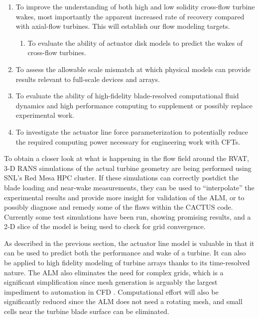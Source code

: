 \begin{enumerate}

	\item To improve the understanding of both high and low solidity cross-flow
    turbine wakes, most importantly the apparent increased rate of recovery
    compared with axial-flow turbines. This will establish our flow modeling
    targets.
    
    \begin{enumerate}
        \item To evaluate the ability of actuator disk models to predict the
        wakes of cross-flow turbines.
    \end{enumerate}
	
	\item To assess the allowable scale mismatch at which physical models can
	provide results relevant to full-scale devices and arrays.
	
	\item To evaluate the ability of high-fidelity blade-resolved computational
    fluid dynamics and high performance computing to supplement or possibly replace
    experimental work.
    
    \item To investigate the actuator line force parameterization to potentially
    reduce the required computing power necessary for engineering work with
    CFTs.
\end{enumerate}

To obtain a closer look at what is happening in the flow field around the RVAT,
3-D RANS simulations of the actual turbine geometry are being performed using
SNL's Red Mesa HPC cluster. If these simulations can correctly postdict the
blade loading and near-wake measurements, they can be used to ``interpolate''
the experimental results and provide more insight for validation of the ALM, or
to possibly diagnose and remedy some of the flaws within the CACTUS code.
Currently some test simulations have been run, showing promising results, and a
2-D slice of the model is being used to check for grid convergence.

As described in the previous section, the actuator line model is valuable in
that it can be used to predict both the performance and wake of a turbine. It
can also be applied to high fidelity modeling of turbine arrays thanks to its
time-resolved nature. The ALM also eliminates the need for complex grids, which
is a significant simplification since mesh generation is arguably the largest
impediment to automation in CFD \cite{Slotnick2014}. Computational effort will
also be significantly reduced since the ALM does not need a rotating mesh, and
small cells near the turbine blade surface can be eliminated.


